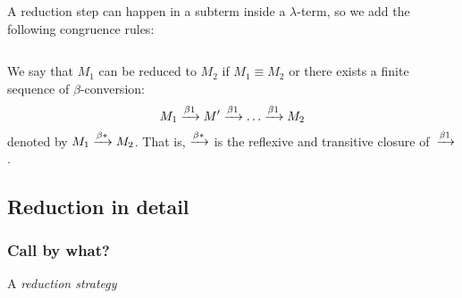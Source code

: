 \begin{definition}
  A reduction step can happen in a subterm inside a $\lambda$-term, so
  we add the following congruence rules:
  \begin{columns}
    \begin{prooftree}
    \end{prooftree}
    \begin{prooftree}
    \end{prooftree}
  \end{columns}
  \begin{columns}
    \begin{prooftree}
    \end{prooftree}
    \begin{prooftree}
    \end{prooftree}
  \end{columns}
\end{definition}

\begin{definition}
  We say that $M_1$ can be reduced to $M_2$
  if $M_1 \equiv M_2$ or there exists a finite sequence of $\beta$-conversion:
  \[
    M_1 \onereduce M' \onereduce \dots \onereduce M_2
  \]
  denoted by $M_1 \reduce M_2$. That is, $\reduce$ is the
  reflexive and transitive closure of~$\onereduce$.
\end{definition}
\subsection{Reduction in detail}
\subsubsection*{Call by what?}
\begin{definition}
  A \emph{reduction strategy} 
\end{definition}

